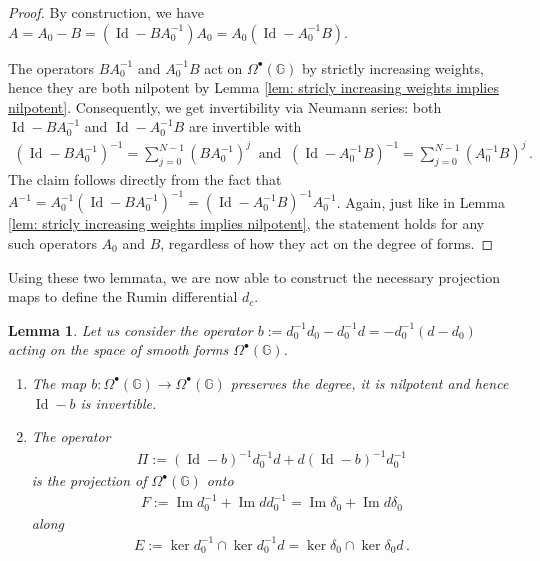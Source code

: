 \documentclass[dvipsnames]{amsart}
\newtheorem{lemma}[theorem]{Lemma}
\theoremstyle{definition}
\theoremstyle{definition}
\numberwithin{equation}{section}
\newcommand{\G}{\mathbb{G}}
\begin{document}
\begin{proof}
    By construction, we have $A=A_0-B=\left(\operatorname{Id}-BA_0^{-1}\right)A_0=A_0\left(\operatorname{Id}-A_0^{-1}B\right)$. 

    The operators $BA_0^{-1}$ and $A_0^{-1}B$ act on $\Omega^\bullet(\G)$ by strictly increasing weights, hence they are both nilpotent by Lemma \ref{lem: stricly increasing weights implies nilpotent}. Consequently, we get invertibility via Neumann series: both $\operatorname{Id}-BA_0^{-1}$ and $\operatorname{Id}-A_0^{-1}B$ are invertible with 
    \begin{align*}
        \left(\operatorname{Id}-BA_0^{-1}\right)^{-1}=\sum_{j=0}^{N-1}\left(BA_0^{-1}\right)^j\ \text{ and }\ \left(\operatorname{Id}-A_0^{-1}B\right)^{-1}=\sum_{j=0}^{N-1}\left(A_0^{-1}B\right)^j\,.
    \end{align*}
    The claim follows directly from the fact that $A^{-1}=A_0^{-1}\left(\operatorname{Id}-BA_0^{-1}\right)^{-1}=\left(\operatorname{Id}-A_0^{-1}B\right)^{-1}A_0^{-1}$. Again, just like in Lemma \ref{lem: stricly increasing weights implies nilpotent}, the statement holds for any such operators $A_0$ and $B$, regardless of how they act on the degree of forms.
\end{proof}
Using these two lemmata, we are now able to construct the necessary projection maps to define the Rumin differential $d_c$.
\begin{lemma}\label{lem: Pi_E}
    Let us consider the operator $b:=d_0^{-1}d_0-d_0^{-1}d=-d_0^{-1}(d-d_0)$ acting on the space of smooth forms $\Omega^\bullet(\G)$.
    \begin{enumerate}
        \item The map $b\colon\Omega^{\bullet}(\G)\longrightarrow\Omega^\bullet(\G)$ preserves the degree, it is nilpotent and hence $\operatorname{Id}-b$ is invertible.
        \item The operator
        \begin{align}\label{eq: Pi projection}
            \Pi:=\left(\operatorname{Id}-b\right)^{-1}d_0^{-1}d+d\left(\operatorname{Id}-b\right)^{-1}d_0^{-1}
        \end{align}
        is the projection of $\Omega^\bullet(\G)$ onto
        \begin{align*}
            F:=\operatorname{Im}d_0^{-1}+\operatorname{Im}dd_0^{-1}=\operatorname{Im}\delta_0+\operatorname{Im}d\delta_0
        \end{align*}
        along
        \begin{align*}
            E:=\ker d_0^{-1}\cap\ker d_0^{-1}d=\ker\delta_0\cap\ker\delta_0d\,.
        \end{align*}
    \end{enumerate}
\end{lemma}
\end{document}
